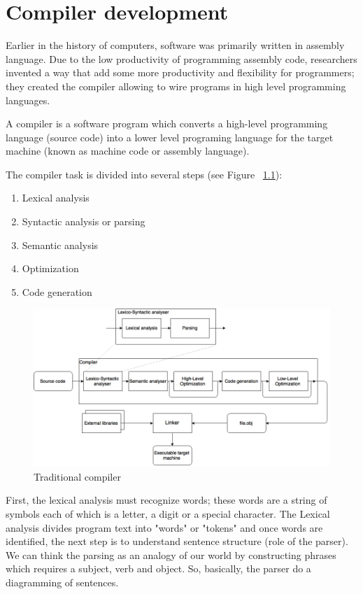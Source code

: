 \documentclass[
  oneside,
  11pt, a4paper,
  footinclude=true,
  headinclude=true,
  cleardoublepage=empty
]{scrbook}
\begin{document}
\chapter{Compiler development}
Earlier in the history of computers, software was primarily written in assembly language. Due to the low productivity of programming assembly code, researchers invented a way that add some more productivity and flexibility for programmers; they created the compiler allowing to wire programs in high level programming languages.

A compiler is a software program which converts a high-level programming language (source code) into a lower level programing language for the target machine (known as machine code or assembly language).

The compiler task is divided into several steps (see Figure ~\ref{fig:compiler}):
\begin{enumerate}
  \item Lexical analysis
  \item Syntactic analysis or parsing
  \item Semantic analysis
  \item Optimization
  \item Code generation
\end{enumerate}

\begin{figure}
\begin{center}
       \includegraphics[width=1\textwidth]{img/compiler.png}
\end{center}
\caption{Traditional compiler}
\label{fig:compiler}
\end{figure}
First, the lexical analysis must recognize words; these words are a string of symbols each of which is a letter, a digit or a special character.
The Lexical analysis divides program text into "words" or "tokens" and once words are identified, the next step is to understand sentence structure (role of the parser).
We can think the parsing as an analogy of our world by constructing phrases which requires a subject, verb and object. So, basically, the parser do a diagramming of sentences. %
\end{document}
